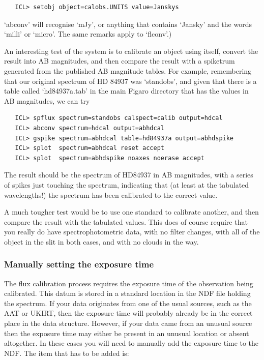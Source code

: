 \documentclass[11pt,twoside]{article}
\begin{document}
\begin{verbatim}
   ICL> setobj object=calobs.UNITS value=Janskys
\end{verbatim}

   `abconv' will recognise `mJy', or anything that contains `Jansky'
   and the words `milli' or `micro'.  The same remarks apply to
   `flconv'.)

   An interesting test of the system is to calibrate an object using
   itself, convert the result into AB magnitudes, and then compare the
   result with a spiketrum generated from the published AB magnitude
   tables.  For example, remembering that our original spectrum of
   HD 84937 was `standobs', and given that there is a table called
   `hd84937a.tab' in the main Figaro directory that has the values in AB
   magnitudes, we can try

\begin{verbatim}
   ICL> spflux spectrum=standobs calspect=calib output=hdcal
   ICL> abconv spectrum=hdcal output=abhdcal
   ICL> gspike spectrum=abhdcal table=hd84937a output=abhdspike
   ICL> splot  spectrum=abhdcal reset accept
   ICL> splot  spectrum=abhdspike noaxes noerase accept
\end{verbatim}

   The result should be the spectrum of HD84937 in AB magnitudes, with a
   series of spikes just touching the spectrum, indicating that (at
   least at the tabulated wavelengths!) the spectrum has been calibrated
   to the correct value.

   A much tougher test would be to use one standard to calibrate
   another, and then compare the result with the tabulated values.  This
   does of course require that you really do have spectrophotometric
   data, with no filter changes, with all of the object in the slit in
   both cases, and with no clouds in the way.


\subsubsection{\label{techno5manexp}Manually setting the exposure time}

The flux calibration process requires the exposure time of the observation
being calibrated.  This datum is stored in a standard location in the NDF
file holding the spectrum.  If your data originates from one of the
usual sources, such as the AAT or UKIRT, then the exposure time will
probably already be in the correct place in the data structure.  However,
if your data came from an unusual source then the exposure time may either
be present in an unusual location or absent altogether.  In these cases
you will need to manually add the exposure time to the NDF.  The item
that has to be added is:
\end{document}
